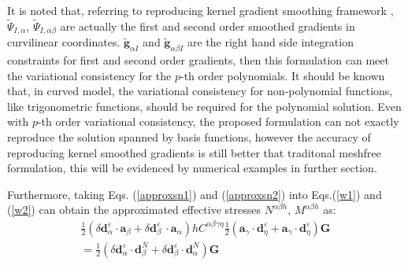 It is noted that, referring to reproducing kernel gradient smoothing framework \cite{wang2019d}, $\tilde \Psi_{I,\alpha}$, $\tilde \Psi_{I,\alpha\beta}$ are actually the first and second order smoothed gradients in curvilinear coordinates. $\tilde{\boldsymbol g}_{\alpha I}$ and $\tilde{\boldsymbol g}_{\alpha \beta I}$ are the right hand side integration constraints for first and second order gradients, then this formulation can meet the variational consistency for the $p$-th order polynomials. It should be known that, in curved model, the variational consistency for non-polynomial functions, like trigonometric functions, should be required for the polynomial solution. Even with $p$-th order variational consistency, the proposed formulation can not exactly reproduce the solution spanned by basis functions, however the accuracy of reproducing kernel smoothed gradients is still better that traditonal meshfree formulation, this will be evidenced by numerical examples in further section.

Furthermore, taking Eqs. (\ref{approxsn1}) and (\ref{approxsn2}) into Eqs.(\ref{w1}) and (\ref{w2}) can obtain the approximated effective stresses $N^{\alpha\beta h}$, $M^{\alpha\beta h}$ as:
\begin{multline}
\frac{1}{2}(\delta \boldsymbol d^\varepsilon_\alpha \cdot \boldsymbol a_\beta + \delta \boldsymbol d^\varepsilon_\beta\ \cdot \boldsymbol a_\alpha)
h C^{\alpha\beta\gamma\eta}
\frac{1}{2}(\boldsymbol a_\gamma \cdot \boldsymbol d^\varepsilon_\eta + \boldsymbol a_\gamma \cdot \boldsymbol d^\varepsilon_\eta)
\boldsymbol G \\ = 
\frac{1}{2}(\delta \boldsymbol d^\varepsilon_\alpha \cdot \boldsymbol d^N_\beta + \delta \boldsymbol d^\varepsilon_\beta \cdot \boldsymbol d^N_\alpha) \boldsymbol G
\end{multline}
